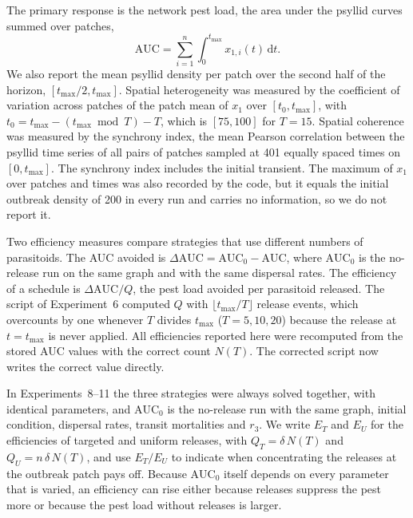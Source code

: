 The primary response is the network pest load, the area under the psyllid curves summed over patches,
\begin{equation}
\mathrm{AUC} = \sum_{i=1}^{n}\int_0^{t_{\max}} x_{1,i}(t)\,\mathrm{d}t .
\end{equation}
We also report the mean psyllid density per patch over the second half of the horizon, $[t_{\max}/2, t_{\max}]$. Spatial heterogeneity was measured by the coefficient of variation across patches of the patch mean of $x_1$ over $[t_0, t_{\max}]$, with $t_0 = t_{\max} - (t_{\max} \bmod T) - T$, which is $[75, 100]$ for $T = 15$. Spatial coherence was measured by the synchrony index, the mean Pearson correlation between the psyllid time series of all pairs of patches sampled at 401 equally spaced times on $[0, t_{\max}]$. The synchrony index includes the initial transient. The maximum of $x_1$ over patches and times was also recorded by the code, but it equals the initial outbreak density of 200 in every run and carries no information, so we do not report it.

Two efficiency measures compare strategies that use different numbers of parasitoids. The AUC avoided is $\Delta\mathrm{AUC} = \mathrm{AUC}_0 - \mathrm{AUC}$, where $\mathrm{AUC}_0$ is the no-release run on the same graph and with the same dispersal rates. The efficiency of a schedule is $\Delta\mathrm{AUC}/Q$, the pest load avoided per parasitoid released. The script of Experiment~6 computed $Q$ with $\lfloor t_{\max}/T\rfloor$ release events, which overcounts by one whenever $T$ divides $t_{\max}$ ($T = 5, 10, 20$) because the release at $t = t_{\max}$ is never applied. All efficiencies reported here were recomputed from the stored AUC values with the correct count $N(T)$. The corrected script now writes the correct value directly.

In Experiments~8--11 the three strategies were always solved together, with identical parameters, and $\mathrm{AUC}_0$ is the no-release run with the same graph, initial condition, dispersal rates, transit mortalities and $r_3$. We write $E_T$ and $E_U$ for the efficiencies of targeted and uniform releases, with $Q_T = \delta\,N(T)$ and $Q_U = n\,\delta\,N(T)$, and use $E_T/E_U$ to indicate when concentrating the releases at the outbreak patch pays off. Because $\mathrm{AUC}_0$ itself depends on every parameter that is varied, an efficiency can rise either because releases suppress the pest more or because the pest load without releases is larger.

